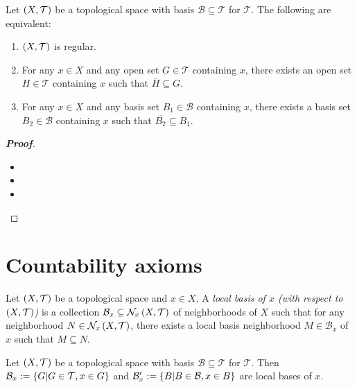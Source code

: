 \begin{proposition}
  Let $\left(X,\mathcal{T}\right)$ be a topological space with basis $\mathcal{B}\subseteq\mathcal{T}$ for $\mathcal{T}$. The following are equivalent:
  
  \begin{enumerate}
    \item $\left(X,\mathcal{T}\right)$ is regular.
    \item For any $x\in X$ and any open set $G\in\mathcal{T}$ containing $x$, there exists an open set $H\in\mathcal{T}$ containing $x$ such that $\overline{H}\subseteq G$.
    \item For any $x\in X$ and any basis set $B_1\in\mathcal{B}$ containing $x$, there exists a basis set $B_2\in\mathcal{B}$ containing $x$ such that $\overline{B_2}\subseteq B_1$.
  \end{enumerate}

  \begin{proof}[\rm\textbf{Proof}]
    \hfill
    \begin{itemize}
      \item[\boxed{1\Rightarrow2}] 
      \item[\boxed{2\Rightarrow3}] 
      \item[\boxed{3\Rightarrow1}] 
    \end{itemize}
  \end{proof}
  
\end{proposition}

\section{Countability axioms}

\begin{definition}
  Let $\left(X,\mathcal{T}\right)$ be a topological space and $x\in X$. A \textit{local basis of $x$ (with respect to $\left(X,\mathcal{T}\right)$)} is a collection $\mathcal{B}_x\subseteq\mathcal{N}_x\left(X,\mathcal{T}\right)$ of neighborhoods of $X$ such that for any neighborhood $N\in\mathcal{N}_x\left(X,\mathcal{T}\right)$, there exists a local basis neighborhood $M\in\mathcal{B}_x$ of $x$ such that $M\subseteq N$.
\end{definition}

\begin{remark}
  Let $\left(X,\mathcal{T}\right)$ be a topological space with basis $\mathcal{B}\subseteq\mathcal{T}$ for $\mathcal{T}$. Then $\mathcal{B}_x:=\left\{G\middle|G\in\mathcal{T},x\in G\right\}$ and $\mathcal{B}_x':=\left\{B\middle|B\in\mathcal{B},x\in B\right\}$ are local bases of $x$.
\end{remark}

